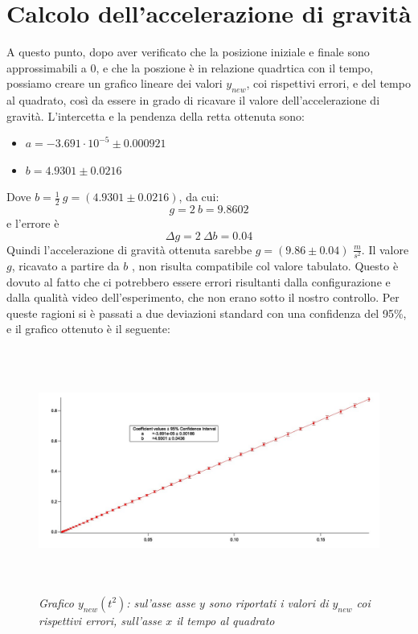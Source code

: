 \documentclass[12pt, a4paper]{article}
\begin{document}
\section{Calcolo dell'accelerazione di gravità}
A questo punto, dopo aver verificato che la posizione iniziale e finale sono approssimabili a $0$, e che la poszione è in relazione quadrtica con il tempo, possiamo creare un grafico lineare dei valori $y_{new}$, coi rispettivi errori, e del tempo al quadrato, così da essere in grado di ricavare il valore dell'accelerazione di gravità. L'intercetta e la pendenza della retta ottenuta sono:
\begin{itemize}
    \item $a=-3.691\cdot 10^{-5}\pm 0.000921$
    \item$b=4.9301\pm 0.0216$
\end{itemize}
Dove $b=\frac{1}{2}\ g=(4.9301\pm 0.0216)$, da cui:
\begin{equation*}
    g=2 \ b=9.8602
\end{equation*}
e l'errore è
\begin{equation*}
    \Delta g=2\ \Delta b=0.04
\end{equation*}
Quindi l'accelerazione di gravità ottenuta sarebbe $g=(9.86\pm0.04)$ $\frac{m}{s^2}$.
Il valore $g$, ricavato a partire da $b$ , non risulta compatibile col valore tabulato. Questo è dovuto al fatto che ci potrebbero essere errori risultanti dalla configurazione e dalla qualità video dell'esperimento, che non erano sotto il nostro controllo. Per queste ragioni si è passati a due deviazioni standard con una confidenza del 95\%, e il grafico ottenuto è il seguente:
  \begin{figure}[h!]
\centering
\includegraphics[width=170mm, height=80mm]{Immagini/Graphy_t^2.jpg}
\caption{\textit{{\footnotesize{Grafico $y_{new}(t^2)$: sul'asse asse $y$ sono riportati i valori di $y_{new}$ coi rispettivi errori, sull'asse $x$ il tempo al quadrato}}}}
\label{Grafico logaritmico}
\end{figure}
\end{document}
